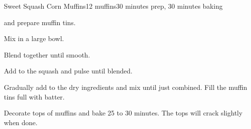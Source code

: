 \documentclass[../Cookbook.tex]{subfiles}
\begin{document}
\begin{recipe}{Sweet Squash Corn Muffins}{12 muffins}{30 minutes prep, 30 minutes baking}

 and prepare muffin tins.

Mix in a large bowl.

Blend together until smooth.

Add to the squash and pulse until blended.

Gradually add to the dry ingredients and mix until just combined. Fill the muffin tins full with batter.

Decorate tops of muffins and bake 25 to 30 minutes. The tops will crack slightly when done.

\end{recipe}
\end{document}
